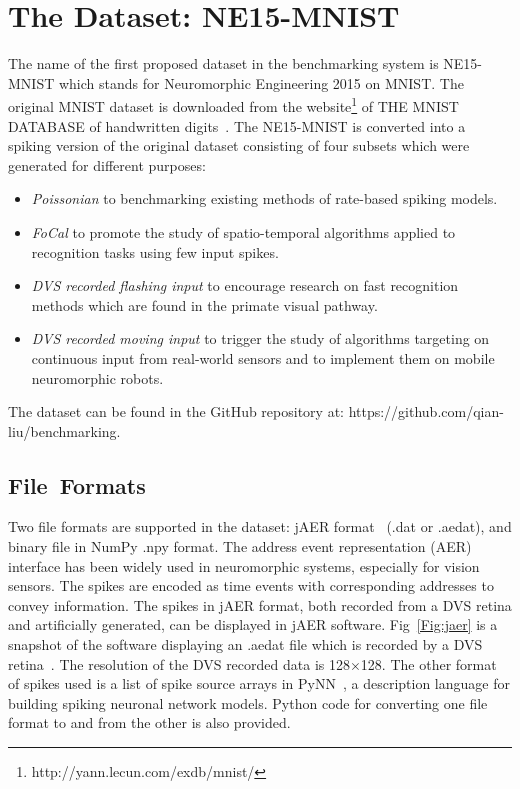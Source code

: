 \section{The Dataset: NE15-MNIST}
\label{sec:data}
The name of the first proposed dataset in the benchmarking system is NE15-MNIST which stands for Neuromorphic Engineering 2015 on MNIST.
The original MNIST dataset is downloaded from the website\footnote{http://yann.lecun.com/exdb/mnist/} of THE MNIST DATABASE of handwritten digits~\citep{lecun1998gradient}.
The NE15-MNIST is converted into a spiking version of the original dataset consisting of four subsets which were generated for different purposes:
\begin{itemize}
	\item \textit{Poissonian}
	to benchmarking existing methods of rate-based spiking models.
	\item \textit{FoCal}
	to promote the study of spatio-temporal algorithms applied to recognition tasks using few input spikes.
	\item \textit{DVS recorded flashing input}
	to encourage research on fast recognition methods which are found in the primate visual pathway.
	\item \textit{DVS recorded moving input}
	to trigger the study of algorithms targeting on continuous input from real-world sensors and to implement them on mobile neuromorphic robots.
\end{itemize}
The dataset can be found in the GitHub repository at: https://github.com/qian-liu/benchmarking.
\subsection{File~Formats}
	
Two file formats are supported in the dataset: jAER format~\citep{delbruck2008frame} (.dat or .aedat), and binary file in NumPy .npy format.
The  address event representation (AER) interface has been widely used in neuromorphic systems, especially for vision sensors.
The spikes are encoded as time events with corresponding addresses to convey information.
The spikes in jAER format, both recorded from a DVS retina and artificially generated, can be displayed in jAER software.
Fig~\ref{Fig:jaer} is a snapshot of the software displaying an .aedat file which is recorded by a DVS retina~\citep{serrano2013128}.
The resolution of the DVS recorded data is 128$\times$128.
The other format of spikes used is a list of spike source arrays in PyNN~\citep{davison2008pynn}, a description language for building spiking neuronal network models.
Python code for converting one file format to and from the other is also provided.


